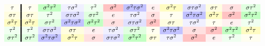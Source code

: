 \documentclass{ximera}
\begin{document}
\begin{example}
\begin{gather*}
\begin{array}{c!{\vline width 2pt}cccccccccccc}
      \tau \cellcolor{yellow!6!white}      & \tau \cellcolor{yellow!6!white}     & \sigma^2\tau^2 \cellcolor{green!24!white}   & \tau\sigma^2 \cellcolor{blue!6!white} & \tau^2\cellcolor{green!6!white}    & \sigma^2\cellcolor{red!24!white}    & \sigma^2\tau\sigma^2\cellcolor{blue!24!white}  & e \cellcolor{red!6!white} & \sigma^2\tau \cellcolor{yellow!24!white} &  \sigma\tau\sigma^2\cellcolor{blue!12!white}  &  \sigma\tau \cellcolor{yellow!12!white}  &  \sigma \cellcolor{red!12!white}  &  \sigma\tau^2 \cellcolor{green!12!white}   \\
      \sigma \tau \cellcolor{yellow!12!white}   & \sigma\tau \cellcolor{yellow!12!white}   & \tau^2 \cellcolor{green!6!white}   & \sigma\tau\sigma^2 \cellcolor{blue!12!white}    & \sigma\tau^2\cellcolor{green!12!white}   & e\cellcolor{red!6!white}     & \tau\sigma^2\cellcolor{blue!6!white}  & \sigma\cellcolor{red!12!white}  &  \tau \cellcolor{yellow!6!white}  & \sigma^2\tau\sigma^2\cellcolor{blue!24!white} & \sigma^2\tau \cellcolor{yellow!24!white}  &  \sigma^2 \cellcolor{red!24!white}  & \sigma^2\tau^2 \cellcolor{green!24!white}  \\  
      \sigma^2 \tau\cellcolor{yellow!24!white}  & \sigma^2 \tau\cellcolor{yellow!24!white} & \sigma\tau^2 \cellcolor{green!12!white}    & \sigma^2 \tau\sigma^2\cellcolor{blue!24!white}   & \sigma^2\tau^2\cellcolor{green!24!white}    & \sigma\cellcolor{red!12!white}   & \sigma\tau\sigma^2\cellcolor{blue!12!white} & \sigma^2\cellcolor{red!24!white} &  \sigma\tau \cellcolor{yellow!12!white}  &  \tau\sigma^2 \cellcolor{blue!6!white}  & \tau \cellcolor{yellow!6!white}  &  e \cellcolor{red!6!white}  & \tau^2 \cellcolor{green!6!white}    \\
      \tau^2\cellcolor{green!6!white}      & \tau^2\cellcolor{green!6!white} & \sigma\tau\sigma^2 \cellcolor{blue!12!white} & \sigma\tau \cellcolor{yellow!12!white} & e\cellcolor{red!6!white} &  \tau\sigma^2 \cellcolor{blue!6!white}  &  \sigma\tau^2 \cellcolor{green!12!white} &  \tau \cellcolor{yellow!6!white}  & \sigma^2\tau\sigma^2 \cellcolor{blue!24!white}  & \sigma \cellcolor{red!12!white}   & \sigma^2\cellcolor{red!24!white} &  \sigma^2\tau^2 \cellcolor{green!24!white}  & \sigma^2\tau \cellcolor{yellow!24!white}\\
      \sigma\tau^2\cellcolor{green!12!white}    & \sigma\tau^2\cellcolor{green!12!white} & \sigma^2\tau\sigma^2\cellcolor{blue!24!white} & \sigma^2\tau \cellcolor{yellow!24!white} & \sigma\cellcolor{red!12!white}& \sigma\tau\sigma^2 \cellcolor{blue!12!white}  & \sigma^2\tau^2 \cellcolor{green!24!white} &  \sigma\tau \cellcolor{yellow!12!white}  & \tau\sigma^2 \cellcolor{blue!6!white}  & \sigma^2 \cellcolor{red!24!white}   & e\cellcolor{red!6!white} &  \tau^2 \cellcolor{green!6!white}  & \tau \cellcolor{yellow!6!white}\\

\end{array}
\end{gather*}
\end{example}
\end{document}
